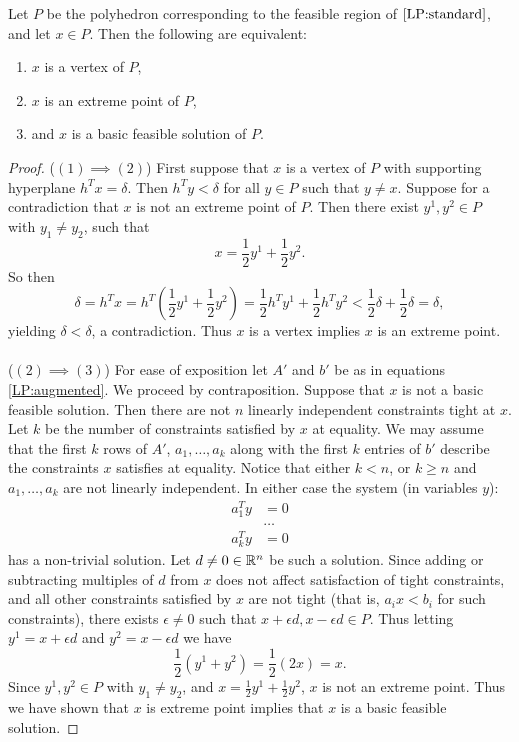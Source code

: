 \begin{lemma} \label{lemma:bfs-equiv}Let $P$ be the polyhedron corresponding to the feasible region of $\ref{LP:standard}$, and let $x \in P$. Then the following are equivalent: 
\begin{enumerate}
\item $x$ is a vertex of $P$,
\item $x$ is an extreme point of $P$, 
\item and $x$ is a basic feasible solution of $P$.
\end{enumerate}
\end{lemma}
\begin{proof}
($(1) \implies (2)$) First suppose that $x$ is a vertex of $P$ with supporting hyperplane $h^T x = \delta$. Then $h^Ty < \delta$ for all $y \in P$ such that $y \neq x$. Suppose for a contradiction that $x$ is not an extreme point of $P$. Then there exist $y^1, y^2 \in P$ with $y_1 \neq y_2$, such that $$ x = \frac{1}{2}y^1 + \frac{1}{2}y^2.$$ So then $$\delta = h^T x = h^T(\frac{1}{2} y^1 + \frac{1}{2} y^2) = \frac{1}{2}h^Ty^1 + \frac{1}{2} h^Ty^2 < \frac{1}{2}\delta +\frac{1}{2}\delta = \delta,$$ yielding $\delta < \delta$, a contradiction. Thus $x$ is a vertex implies $x$ is an extreme point.
\paragraph{}
($(2) \implies (3)$) For ease of exposition let $A'$ and $b'$ be as in equations \ref{LP:augmented}. We proceed by contraposition. Suppose that $x$ is not a basic feasible solution. Then there are not $n$ linearly independent constraints tight at $x$. Let $k$ be the number of constraints satisfied by $x$ at equality. We may assume that the first $k$ rows of $A'$, $a_1, \dots, a_k$ along with the first $k$ entries of $b'$ describe the constraints $x$ satisfies at equality. Notice that either $k<n$, or $k\geq n$ and $a_1, \dots, a_k$ are not linearly independent. In either case the system (in variables $y$):
\begin{align*}
a_1^T y &= 0 \\
&\dots \\
a_k^T y &= 0
\end{align*}
has a non-trivial solution. Let $d \neq 0 \in \mathbb{R}^n$ be such a solution. Since adding or subtracting multiples of $d$ from $x$ does not affect satisfaction of tight constraints, and all other constraints satisfied by $x$ are not tight (that is, $a_i x < b_i$ for such constraints), there exists $\epsilon \neq 0$ such that $x+ \epsilon d, x-\epsilon d \in P$. Thus letting $y^1 = x+ \epsilon d$ and $y^2 = x-\epsilon d$ we have
$$\frac{1}{2}(y^1 + y^2) = \frac{1}{2}(2x) = x.$$
Since $y^1, y^2 \in P$ with $y_1 \neq y_2$, and $x = \frac{1}{2}y^1 + \frac{1}{2}y^2$, $x$ is not an extreme point. Thus we have shown that $x$ is extreme point implies that $x$ is a basic feasible solution.

\end{proof}
